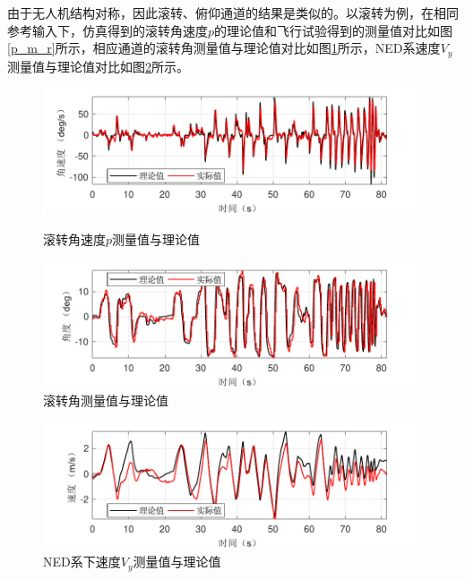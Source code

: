 由于无人机结构对称，因此滚转、俯仰通道的结果是类似的。以滚转为例，在相同参考输入下，仿真得到的滚转角速度$ p $的理论值和飞行试验得到的测量值对比如图\ref{p_m_r}所示，相应通道的滚转角测量值与理论值对比如图\ref{roll_m_r}所示，NED系速度$ V_y $测量值与理论值对比如图\ref{Vy_m_r}所示。
\begin{figure}[htbp]
	\centering	
	\includegraphics[scale=1]{Fig/p_m_r.pdf}
	\caption{\label{p_m_r}滚转角速度$ p $测量值与理论值}
	\centering	
	\includegraphics[scale=1]{Fig/roll_m_r.pdf}
	\caption{\label{roll_m_r}滚转角测量值与理论值}
\end{figure}
\begin{figure}[htbp]
	\centering	
	\includegraphics[scale=1]{Fig/Vy_m_r.pdf}
	\caption{\label{Vy_m_r}NED系下速度$ V_y $测量值与理论值}
\end{figure}


